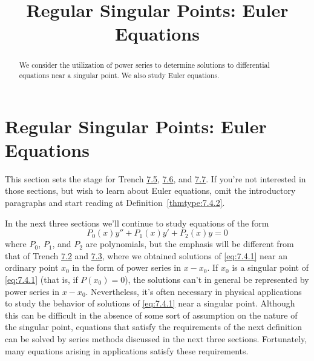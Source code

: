 \documentclass{ximera}
\title{Regular Singular Points:   Euler Equations}%
\begin{document}
\begin{abstract}
We consider the utilization of power series to determine solutions to differential equations near a singular point.  We also study Euler equations.
\end{abstract}

\maketitle

\section*{Regular Singular Points:   Euler Equations}

\begin{remark}This section sets the stage for Trench \href{https://ximera.osu.edu/ode/main/frobeniusI/frobeniusI}{7.5},
\href{https://ximera.osu.edu/ode/main/frobeniusII/frobeniusII}{7.6},
and \href{https://ximera.osu.edu/ode/main/frobeniusIII/frobeniusIII}{7.7}. If you're not interested in those sections, but wish
to learn about Euler equations, omit the introductory paragraphs
and start reading at Definition~\ref{thmtype:7.4.2}.
\end{remark}

In the next three sections we'll continue to study  equations of
the form
\begin{equation}\label{eq:7.4.1}
P_0(x)y''+P_1(x)y'+P_2(x)y=0
\end{equation}
where $P_0$, $P_1$, and $P_2$ are polynomials, but the emphasis will
be different from that of Trench \href{https://ximera.osu.edu/ode/main/seriesSolNearOrdinaryPtI/seriesSolNearOrdinaryPtI}{7.2} and \href{https://ximera.osu.edu/ode/main/seriesSolNearOrdinaryPtII/seriesSolNearOrdinaryPtII}{7.3},
where we
obtained solutions of \eqref{eq:7.4.1} near an ordinary point $x_0$ in the
form of power series in $x-x_0$. If $x_0$ is a singular point of
\eqref{eq:7.4.1} (that is, if $P(x_0)=0$),  the solutions can't in
general be represented by power series in $x-x_0$. Nevertheless, it's
often necessary in physical applications to study the behavior of
solutions of \eqref{eq:7.4.1} near a singular point. Although this can be
difficult in the absence of some sort of assumption on the nature of
the singular point, equations that satisfy the requirements of the
next definition can be solved by series methods discussed in the
next three sections. Fortunately, many equations arising in
applications satisfy these requirements.
\end{document}
